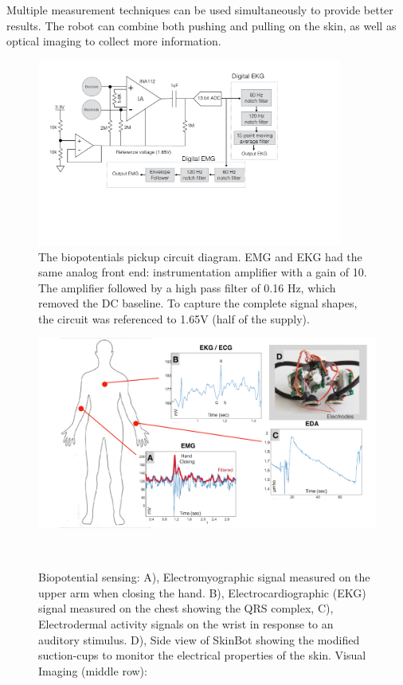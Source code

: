 Multiple measurement techniques can be used simultaneously to provide better results. The robot can combine both pushing and pulling on the skin, as well as optical imaging to collect more information. 

\begin{figure}[!t]
\centering
\includegraphics[width=10.0cm]{pictures/chapter3/biopotential_circuit.pdf}
\caption{The biopotentials pickup circuit diagram. EMG and EKG had the same analog front end: instrumentation amplifier with a gain of 10. The amplifier followed by a high pass filter of 0.16 Hz, which removed the DC baseline. To capture the complete signal shapes, the circuit was referenced to 1.65V (half of the supply). }
\label{fig:biopotential_circuit}
\end{figure}

\begin{figure}[!t]
\centering
\includegraphics[width=1\columnwidth]{pictures/applications/biopotential_sensing.pdf}
\caption{Biopotential sensing: A), Electromyographic signal measured on the upper arm when closing the hand. B), Electrocardiographic (EKG) signal measured on the chest showing the QRS complex, C), Electrodermal activity signals on the wrist in
response to an auditory stimulus. D), Side view of SkinBot showing the modified suction-cups to monitor the electrical properties of the skin. 
Visual Imaging (middle row):}~\label{fig:biopotential_sensing}
\end{figure}

